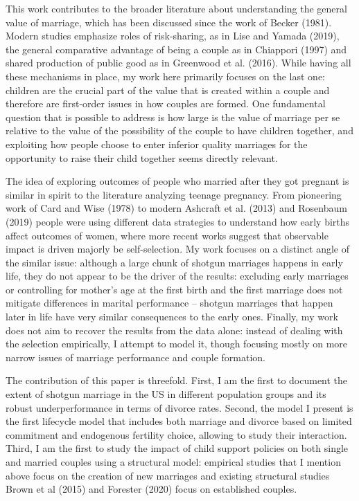 \documentclass[12pt,letter]{article}
\begin{document}
This work contributes to the broader literature about understanding the general value of marriage, which has been discussed since the work of Becker (1981). Modern studies emphasize roles of risk-sharing, as in Lise and Yamada (2019), the general comparative advantage of being a couple as in Chiappori (1997) and shared production of public good as in Greenwood et al. (2016). While having all these mechanisms in place, my work here primarily focuses on the last one: children are the crucial part of the value that is created within a couple and therefore are first-order issues in how couples are formed. One fundamental question that is possible to address is how large is the value of marriage per se relative to the value of the possibility of the couple to have children together, and exploiting how people choose to enter inferior quality marriages for the opportunity to raise their child together seems directly relevant.

The idea of exploring outcomes of people who married after they got pregnant is similar in spirit to the literature analyzing teenage pregnancy. From pioneering work of Card and Wise (1978) to modern Ashcraft et al. (2013) and Rosenbaum (2019) people were using different data strategies to understand how early births affect outcomes of women, where more recent works suggest that observable impact is driven majorly be self-selection. My work focuses on a distinct angle of the similar issue: although a large chunk of shotgun marriages happens in early life, they do not appear to be the driver of the results: excluding early marriages or controlling for mother’s age at the first birth and the first marriage does not mitigate differences in marital performance
-- shotgun marriages that happen later in life have very similar consequences to the early ones. Finally, my work does not aim to recover the results from the data alone: instead of dealing with the selection empirically, I attempt to model it, though focusing mostly on more narrow issues of marriage performance and couple formation.

The contribution of this paper is threefold. First, I am the first to document the extent of shotgun marriage in the US in different population groups and its robust underperformance in terms of divorce rates. Second, the model I present is the first lifecycle model that includes both marriage and divorce based on limited commitment and endogenous fertility choice, allowing to study their interaction. Third, I am the first to study the impact of child support policies on both single and married couples using a structural model: empirical studies that I mention above focus on the creation of new marriages and existing structural studies Brown et al (2015) and Forester (2020) focus on established couples. 
\end{document}
